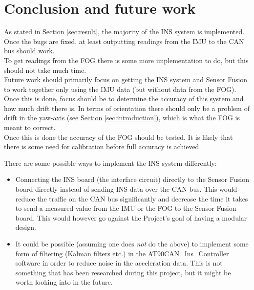 \section{Conclusion and future work}\label{sec:conclusion}
As stated in Section \ref{sec:result}, the majority of the INS system is implemented. Once the bugs are fixed, at least outputting readings from the IMU to the CAN bus should work. \\
To get readings from the FOG there is some more implementation to do, but this should not take much time. \\ %
Future work should primarily focus on getting the INS system and Sensor Fusion to work together only using the IMU data (but without data from the FOG). Once this is done, focus should be to determine the accuracy of this system and how much drift there is. In terms of orientation there should only be a problem of drift in the yaw-axis (see Section \ref{sec:introduction}), which is what the FOG is meant to correct. \\
Once this is done the accuracy of the FOG should be tested. It is likely that there is some need for calibration before full accuracy is achieved.
\pagebreak

There are some possible ways to implement the INS system differently:

\begin{itemize}
\item Connecting the INS board (the interface circuit) directly to the Sensor Fusion board directly instead of sending INS data over the CAN bus. This would reduce the traffic on the CAN bus significantly and decrease the time it takes to send a measured value from the IMU or the FOG to the Sensor Fusion board. This would however go against the Project's goal of having a modular design.

\item It could be possible (assuming one does \emph{not} do the above) to implement some form of filtering (Kalman filters etc.) in the AT90CAN\_Ins\_Controller software in order to reduce noise in the acceleration data. This is not something that has been researched during this project, but it might be worth looking into in the future.

\end{itemize}



